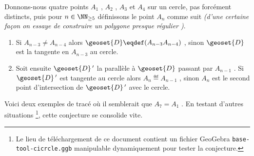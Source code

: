 Donnons-nous quatre points $A_1$ , $A_2$ , $A_3$ et $A_4$ sur un cercle, pas forcément distincts, puis pour $n \in \NN_{\geq 5}$ définissons le point $A_n$ comme suit \emph{(d'une certaine façon on essaye de construire un polygone \emph{\og presque régulier \fg})}.
\begin{enumerate}
	\item Si $A_{n-3} \neq A_{n-4}$ alors $\geoset{D} \eqdef (A_{n-3} A_{n-4})$ , sinon $\geoset{D}$ est la tangente en $A_{n-3}$ au cercle.

	\item Soit ensuite $\geoset{D}\,'$ la parallèle à $\geoset{D}$ passant par $A_{n-1}$ . Si $\geoset{D}\,'$ est tangente au cercle alors $A_n \eqdef A_{n-1}$ , sinon $A_n$ est le second point d'intersection de $\geoset{D}\,'$ avec le cercle.
\end{enumerate}


\medskip

Voici deux exemples de tracé où il semblerait que $A_7 = A_1$ . En testant d'autres situations
\footnote{
	Le lieu de téléchargement de ce document contient un fichier GeoGebra \texttt{base-tool-cicrcle.ggb} manipulable dynamiquement pour tester la conjecture.
},
cette conjecture se consolide vite.
 
